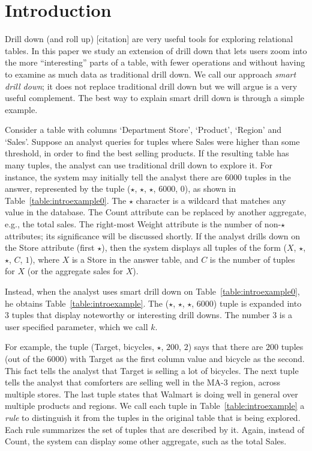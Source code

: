

\section{Introduction}

Drill down (and roll up) [citation] are very useful tools for exploring
relational tables.
In this paper we study an extension of drill down
that lets users zoom into the more ``interesting'' parts of a table,
with fewer operations and without having to examine as much data
as traditional drill down.
We call our approach {\em smart drill down};
it does not replace traditional drill down but we will argue is a very
useful complement.
The best way to explain smart drill down is through a simple example.

\begin{example}\label{ex:introexample}
Consider a table with columns `Department Store', `Product', `Region'
and `Sales'. Suppose an analyst queries for tuples
where Sales were higher than some threshold, in order
to find the best selling products.
If the resulting table has many tuples,
the analyst can use traditional drill down to explore it.
For instance, the system may initially tell the analyst there are
6000 tuples in the answer, represented by the tuple ($\star$, $\star$, $\star$, $6000$, $0$),
as shown in Table~\ref{table:introexample0}.
The $\star$ character is a wildcard that matches any value in the database.
The Count attribute can be replaced by another aggregate,
e.g., the total sales.
The right-most Weight attribute is the number of non-$\star$ attributes; 
its significance will be discussed shortly.
If the analyst drills down on the Store attribute (first $\star$),
then the system displays all tuples of the form ($X$, $\star$, $\star$, $C$, $1$),
where $X$ is a Store in the answer table, and $C$
is the number of tuples for $X$ (or the aggregate sales for $X$).

Instead, when the analyst uses smart drill down on Table~\ref{table:introexample0},
he obtains Table~\ref{table:introexample}.
The ($\star$, $\star$, $\star$, $6000$) tuple is expanded into $3$ tuples
that display noteworthy or interesting drill downs.
The number $3$ is a user specified parameter, which we call $k$.

For example, the tuple (Target, bicycles, $\star$, $200$, $2$)
says that there are $200$ tuples (out of the 6000) with
Target as the first column value and bicycle as the second.
This fact tells the analyst that Target is selling a lot of bicycles.
The next tuple tells the analyst that comforters are selling well in
the MA-3 region, across multiple stores. The last tuple
states that Walmart is doing well in general over multiple products and regions.
We call each tuple in Table~\ref{table:introexample} a {\em rule}
to distinguish it from the tuples in the original table that is being explored.
Each rule summarizes the set of tuples that are described by it.
Again, instead of Count, the system can display some other aggregate, such as
the total Sales.


\end{example}
